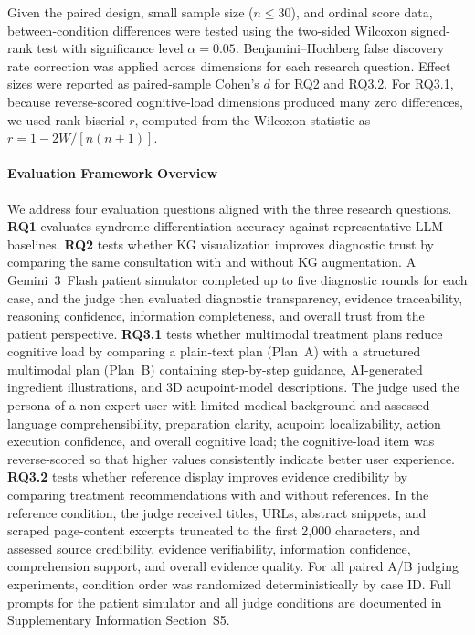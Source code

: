 Given the paired design, small sample size ($n \leq 30$), and ordinal score data, between-condition differences were tested using the two-sided Wilcoxon signed-rank test with significance level $\alpha=0.05$. Benjamini--Hochberg false discovery rate correction was applied across dimensions for each research question. Effect sizes were reported as paired-sample Cohen's $d$ for RQ2 and RQ3.2. For RQ3.1, because reverse-scored cognitive-load dimensions produced many zero differences, we used rank-biserial $r$, computed from the Wilcoxon statistic as $r = 1 - 2W/[n(n+1)]$.

\paragraph{Evaluation Framework Overview}

We address four evaluation questions aligned with the three research questions. \textbf{RQ1} evaluates syndrome differentiation accuracy against representative LLM baselines. \textbf{RQ2} tests whether KG visualization improves diagnostic trust by comparing the same consultation with and without KG augmentation. A Gemini~3~Flash patient simulator completed up to five diagnostic rounds for each case, and the judge then evaluated diagnostic transparency, evidence traceability, reasoning confidence, information completeness, and overall trust from the patient perspective. \textbf{RQ3.1} tests whether multimodal treatment plans reduce cognitive load by comparing a plain-text plan (Plan~A) with a structured multimodal plan (Plan~B) containing step-by-step guidance, AI-generated ingredient illustrations, and 3D acupoint-model descriptions. The judge used the persona of a non-expert user with limited medical background and assessed language comprehensibility, preparation clarity, acupoint localizability, action execution confidence, and overall cognitive load; the cognitive-load item was reverse-scored so that higher values consistently indicate better user experience. \textbf{RQ3.2} tests whether reference display improves evidence credibility by comparing treatment recommendations with and without references. In the reference condition, the judge received titles, URLs, abstract snippets, and scraped page-content excerpts truncated to the first 2,000 characters, and assessed source credibility, evidence verifiability, information confidence, comprehension support, and overall evidence quality. For all paired A/B judging experiments, condition order was randomized deterministically by case ID. Full prompts for the patient simulator and all judge conditions are documented in Supplementary Information Section~S5.
